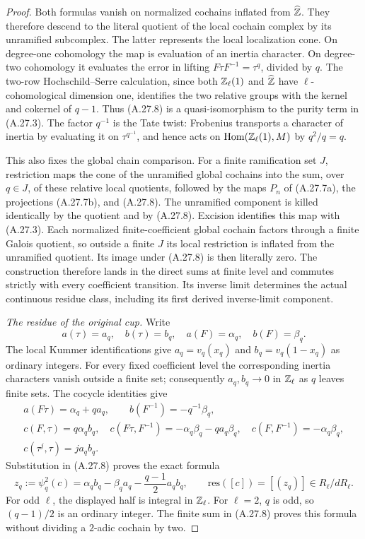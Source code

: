 \begin{proof}
Both formulas vanish on normalized cochains inflated from
$\widehat{\mathbb Z}$. They therefore descend to the literal quotient
of the local cochain complex by its unramified subcomplex.
The latter represents the local localization cone. On
degree-one cohomology the map is evaluation of an inertia
character. On degree-two cohomology it evaluates the error
in lifting $F\tau F^{-1}=\tau^q$, divided by $q$.
The two-row Hochschild--Serre calculation, since both
$\mathbb Z_\ell(1)$ and $\widehat{\mathbb Z}$ have $\ell$-cohomological
dimension one, identifies the two relative groups with
the kernel and cokernel of $q-1$. Thus (A.27.8) is a
quasi-isomorphism to the purity term in (A.27.3).
The factor $q^{-1}$ is the Tate twist: Frobenius transports
a character of inertia by evaluating it on
$\tau^{q^{-1}}$, and hence acts on
$\operatorname{Hom}(\mathbb Z_\ell(1),M)$ by $q^2/q=q$.

This also fixes the global chain comparison. For a finite
ramification set $J$, restriction maps the cone of the
unramified global cochains into the sum, over $q\in J$,
of these relative local quotients, followed by the maps
$P_n$ of (A.27.7a), the projections (A.27.7b), and (A.27.8).
The unramified component
is killed identically by the quotient and by (A.27.8).
Excision identifies this map with (A.27.3). Each normalized
finite-coefficient global cochain factors through a finite
Galois quotient, so outside a finite $J$ its local restriction
is inflated from the unramified quotient. Its image under
(A.27.8) is then literally zero. The construction therefore
lands in the direct sums at finite level and commutes
strictly with every coefficient transition. Its inverse
limit determines the actual continuous residue class,
including its first derived inverse-limit component.

\emph{The residue of the original cup.}
Write
\[
 a(\tau)=a_q,\quad b(\tau)=b_q,\quad
 a(F)=\alpha_q,\quad b(F)=\beta_q.
\]
The local Kummer identifications give
$a_q=v_q(x_q)$ and $b_q=v_q(1-x_q)$ as ordinary integers.
For every fixed coefficient level the corresponding inertia
characters vanish outside a finite set; consequently
$a_q,b_q\to0$ in $\mathbb Z_\ell$ as $q$ leaves finite sets.
The cocycle identities give
\[
 \begin{gathered}
 a(F\tau)=\alpha_q+q a_q,
 \qquad b(F^{-1})=-q^{-1}\beta_q,\\
 c(F,\tau)=q\alpha_q b_q,
 \quad c(F\tau,F^{-1})=-\alpha_q\beta_q-q a_q\beta_q,
 \quad c(F,F^{-1})=-\alpha_q\beta_q,\\
 c(\tau^j,\tau)=j a_qb_q.
 \end{gathered}
\]
Substitution in (A.27.8) proves the exact formula
\[
 z_q:=\psi_q^2(c)
   =\alpha_q b_q-\beta_q a_q-
                          \frac{q-1}{2}a_qb_q,
 \qquad \mathrm{res}([c])=[(z_q)]\in R_\ell/dR_\ell.
 \tag{A.27.10}
\]
For odd $\ell$, the displayed half is integral in $\mathbb Z_\ell$.
For $\ell=2$, $q$ is odd, so $(q-1)/2$ is an ordinary
integer. The finite sum in (A.27.8) proves this formula
without dividing a $2$-adic cochain by two.


\end{proof}
